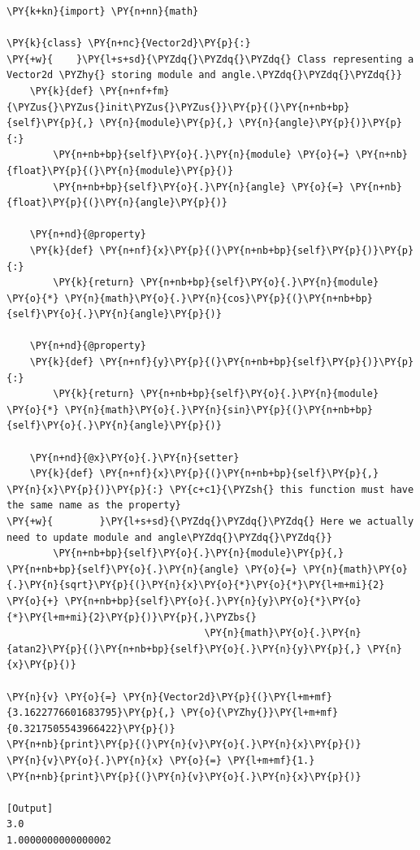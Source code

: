 \begin{Verbatim}[label=\makebox{\url{https://github.com/lucabaldini/cmepda/tree/master/slides/latex/snippets/vector2d\_property\_setter.py}},commandchars=\\\{\}]
\PY{k+kn}{import} \PY{n+nn}{math}

\PY{k}{class} \PY{n+nc}{Vector2d}\PY{p}{:}
\PY{+w}{    }\PY{l+s+sd}{\PYZdq{}\PYZdq{}\PYZdq{} Class representing a Vector2d \PYZhy{} storing module and angle.\PYZdq{}\PYZdq{}\PYZdq{}}   
    \PY{k}{def} \PY{n+nf+fm}{\PYZus{}\PYZus{}init\PYZus{}\PYZus{}}\PY{p}{(}\PY{n+nb+bp}{self}\PY{p}{,} \PY{n}{module}\PY{p}{,} \PY{n}{angle}\PY{p}{)}\PY{p}{:}
        \PY{n+nb+bp}{self}\PY{o}{.}\PY{n}{module} \PY{o}{=} \PY{n+nb}{float}\PY{p}{(}\PY{n}{module}\PY{p}{)}
        \PY{n+nb+bp}{self}\PY{o}{.}\PY{n}{angle} \PY{o}{=} \PY{n+nb}{float}\PY{p}{(}\PY{n}{angle}\PY{p}{)}
   
    \PY{n+nd}{@property}
    \PY{k}{def} \PY{n+nf}{x}\PY{p}{(}\PY{n+nb+bp}{self}\PY{p}{)}\PY{p}{:}
        \PY{k}{return} \PY{n+nb+bp}{self}\PY{o}{.}\PY{n}{module} \PY{o}{*} \PY{n}{math}\PY{o}{.}\PY{n}{cos}\PY{p}{(}\PY{n+nb+bp}{self}\PY{o}{.}\PY{n}{angle}\PY{p}{)}
        
    \PY{n+nd}{@property}
    \PY{k}{def} \PY{n+nf}{y}\PY{p}{(}\PY{n+nb+bp}{self}\PY{p}{)}\PY{p}{:}
        \PY{k}{return} \PY{n+nb+bp}{self}\PY{o}{.}\PY{n}{module} \PY{o}{*} \PY{n}{math}\PY{o}{.}\PY{n}{sin}\PY{p}{(}\PY{n+nb+bp}{self}\PY{o}{.}\PY{n}{angle}\PY{p}{)}
    
    \PY{n+nd}{@x}\PY{o}{.}\PY{n}{setter}
    \PY{k}{def} \PY{n+nf}{x}\PY{p}{(}\PY{n+nb+bp}{self}\PY{p}{,} \PY{n}{x}\PY{p}{)}\PY{p}{:} \PY{c+c1}{\PYZsh{} this function must have the same name as the property}
\PY{+w}{        }\PY{l+s+sd}{\PYZdq{}\PYZdq{}\PYZdq{} Here we actually need to update module and angle\PYZdq{}\PYZdq{}\PYZdq{}}
        \PY{n+nb+bp}{self}\PY{o}{.}\PY{n}{module}\PY{p}{,} \PY{n+nb+bp}{self}\PY{o}{.}\PY{n}{angle} \PY{o}{=} \PY{n}{math}\PY{o}{.}\PY{n}{sqrt}\PY{p}{(}\PY{n}{x}\PY{o}{*}\PY{o}{*}\PY{l+m+mi}{2} \PY{o}{+} \PY{n+nb+bp}{self}\PY{o}{.}\PY{n}{y}\PY{o}{*}\PY{o}{*}\PY{l+m+mi}{2}\PY{p}{)}\PY{p}{,}\PYZbs{}
                                  \PY{n}{math}\PY{o}{.}\PY{n}{atan2}\PY{p}{(}\PY{n+nb+bp}{self}\PY{o}{.}\PY{n}{y}\PY{p}{,} \PY{n}{x}\PY{p}{)}
        
\PY{n}{v} \PY{o}{=} \PY{n}{Vector2d}\PY{p}{(}\PY{l+m+mf}{3.1622776601683795}\PY{p}{,} \PY{o}{\PYZhy{}}\PY{l+m+mf}{0.3217505543966422}\PY{p}{)}
\PY{n+nb}{print}\PY{p}{(}\PY{n}{v}\PY{o}{.}\PY{n}{x}\PY{p}{)}
\PY{n}{v}\PY{o}{.}\PY{n}{x} \PY{o}{=} \PY{l+m+mf}{1.}
\PY{n+nb}{print}\PY{p}{(}\PY{n}{v}\PY{o}{.}\PY{n}{x}\PY{p}{)}

[Output]
3.0
1.0000000000000002
\end{Verbatim}